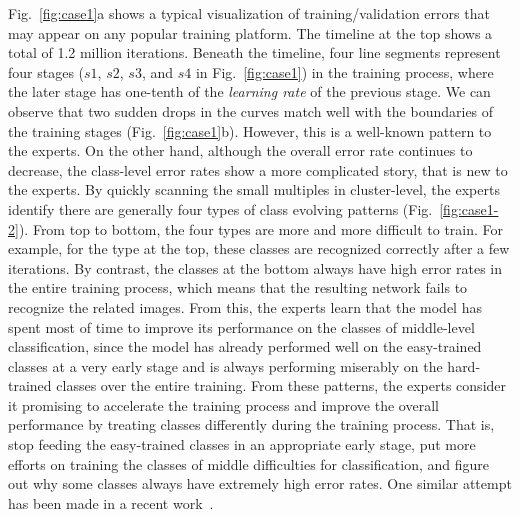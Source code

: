\documentclass[format=acmsmall, review=false, screen=true]{acmart}
\newcommand{\ti}{\textcolor[rgb]{0,0,0}}
\newcommand{\dy}{\textcolor[rgb]{0,0,0}}
\begin{document}
Fig.~\ref{fig:case1}a shows a typical visualization of training/validation errors that may appear on any popular training platform. The timeline at the top shows a total of 1.2 million iterations.
Beneath the timeline, four line segments represent four stages ($s1$, $s2$, $s3$, and $s4$ in Fig.~\ref{fig:case1}) in the training process, \dy{where the later stage has one-tenth of the \textit{learning rate} of the previous stage.}%
We can observe that two sudden drops in the curves match well with the boundaries of the training stages (Fig.~\ref{fig:case1}b).
However, this is a well-known pattern to the experts.
On the other hand, although the overall error rate continues to decrease, the class-level error rates show a more complicated story, that is new to the experts.
By quickly scanning the small multiples in cluster-level, the experts identify there are generally four types of class evolving patterns (Fig.~\ref{fig:case1-2}).
From top to bottom, the four types are more and more difficult to train.
\ti{For example, for the type at the top, these classes are recognized correctly after a few iterations.
By contrast, the classes at the bottom always have high error rates in the entire training process, which means that the resulting network fails to recognize the related images.}
From this, the experts learn that the model has spent most of time to improve its performance on the classes of middle-level classification, since the model has already performed well on the easy-trained classes at a very early stage and is always performing miserably on the hard-trained classes over the entire training.
From these patterns, the experts consider it promising to accelerate the training process and improve the overall performance by treating classes differently during the training process. That is, stop feeding the easy-trained classes in an appropriate early stage, put more efforts on training the classes of middle difficulties for classification, and figure out why some classes always have extremely high error rates. One similar attempt has been made in a recent work~\cite{lin2017focal}.
\end{document}
